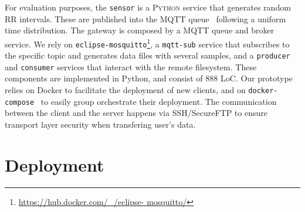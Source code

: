 For evaluation purposes, the \texttt{sensor} is a \textsc{Python} service that generates random RR intervals.
These are published into the \textsc{MQTT} queue~\cite{mqtt-protocol,mqtt-eclipse} following a uniform time distribution. 
The gateway is composed by a \textsc{MQTT} queue and broker service.
We rely on \texttt{eclipse-mosquitto}\footnote{\url{https://hub.docker.com/_/eclipse- mosquitto/}}, a \texttt{mqtt-sub} service that subscribes to the specific topic and generates data files with several samples, and a \texttt{producer} and \texttt{consumer} services that interact with the remote filesystem.
These components are implemented in Python, and consist of $888$ LoC. %
Our prototype relies on Docker to facilitate the deployment of new clients, and on \texttt{docker-compose}~\cite{docker-compose} to easily group orchestrate their deployment. %
The communication between the client and the server happens via SSH/SecureFTP to ensure transport layer security when transfering user's data. %

\section{Deployment} \label{sec:deployment}

